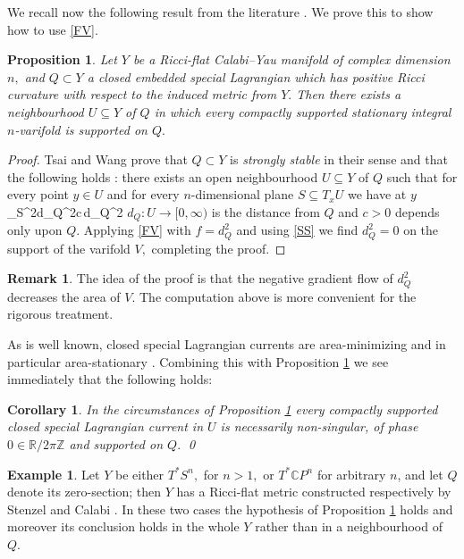 \documentclass{article}
\theoremstyle{plain}%
\newtheorem{prop}[thm]{Proposition}
\newtheorem{cor}[thm]{Corollary}
\theoremstyle{definition}
\newtheorem{exam}[thm]{Example}
\newtheorem{rem}[thm]{Remark}
\numberwithin{equation}{section}
\numberwithin{figure}{section}
\def\e#1\e{\begin{equation}#1\end{equation}}
\def\eq{\eqref}
\def\l{\label}
\def\ge{\geqslant}
\def\CP{{\mathbin{\mathbb{C}}}P}
\def\R{{\mathbin{\mathbb R}}}
\def\Z{{\mathbin{\mathbb Z}}}
\def\iy{\infty}
\def\nb{\nabla}
\def\sb{\subseteq}
\begin{document}
We recall now the following result from the literature \cite{LotayS,TW0,TW}. We prove this to show how to use \eq{FV}.
\begin{prop}\l{TW}
Let $Y$ be a Ricci-flat Calabi--Yau manifold of complex dimension $n,$ and $Q\subset Y$ a closed embedded special Lagrangian which has positive Ricci curvature with respect to the induced metric from $Y.$
Then there exists a neighbourhood $U\sb Y$ of $Q$ in which every compactly supported stationary integral $n$-varifold is supported on $Q.$
\end{prop}
\begin{proof}
Tsai and Wang prove that $Q\subset Y$ is {\it strongly stable} in their sense \cite[Proposition A(iii)]{TW} and that the following holds \cite[Proposition 4.1]{TW}: there exists an open neighbourhood $U\sb Y$ of $Q$ such that for every point $y\in U$ and for every $n$-dimensional plane $S\sb T_xU$ we have at $y$
\e\l{SS}\tr_S\nb^2d_Q^2\ge c\,d_Q^2\e
where $d_Q:U\to[0,\iy)$ is the distance from $Q$ and $c>0$ depends only upon $Q.$
Applying \eq{FV} with $f=d_Q^2$ and using \eq{SS} we find $d_Q^2=0$ on the support of the varifold $V,$ completing the proof.
\end{proof}
\begin{rem}
The idea of the proof is that the negative gradient flow of $d_Q^2$ decreases the area of $V.$ The computation above is more convenient for the rigorous treatment.
\end{rem}
As is well known, closed special Lagrangian currents are area-minimizing and in particular area-stationary \cite{HL}. Combining this with Proposition \ref{TW} we see immediately that the following holds:
\begin{cor}\l{cor: TW}
In the circumstances of Proposition \ref{TW} every compactly supported closed special Lagrangian current in $U$ is necessarily non-singular, of phase $0\in\R/2\pi\Z$ and supported on $Q.$
\qed
\end{cor}
\begin{exam}
Let $Y$ be either $T^*S^n,$ for $n>1,$ or $T^*\CP^{n}$ for arbitrary $n$, and let $Q$ denote its zero-section; then $Y$ has a Ricci-flat metric constructed respectively by Stenzel \cite{St} and Calabi \cite{Cal}. In these two cases the hypothesis of Proposition \ref{TW} holds and moreover its conclusion holds in the whole $Y$ rather than in a neighbourhood of $Q.$
\end{exam}
\end{document}
